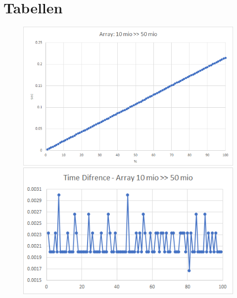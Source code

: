 \documentclass{TUBAFarbeiten}
\begin{document}
\section{Tabellen}
\begin{figure}[H]
\label{fig:Array10-50}
\includegraphics[scale=0.9]{Array10-50}
\begin{center}
\includegraphics[scale=1]{Array10-50-Time}
\end{center}
\end{figure}
\end{document}
